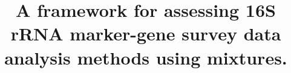 \documentclass[linenumbers]{bmcart} %
\providecommand{\DIFaddbegin}{} %
\providecommand{\DIFaddend}{} %
\providecommand{\DIFdelbegin}{} %
\providecommand{\DIFdelend}{} %
\begin{document}
\begin{frontmatter}

\begin{fmbox}


\title{A framework for assessing 16S rRNA marker-gene survey data analysis methods using mixtures.}


\author[
   addressref={aff1,aff2,aff3},                   %
   corref={aff1},                       %
   email={nolson@nist.gov}   %
]{\DIFdelbegin %
\DIFdelend \DIFaddbegin {} \DIFaddend {}}
\author[
   addressref={aff2,aff3},
   email={smuthiah@umiacs.umd.edu}
]{ }
\author[
   addressref={aff4},
   email={sli1@epi.umaryland.edu}
]{ }
\DIFaddbegin \author[
   addressref={aff2,aff3},
   email={dbraccia@umd.edu}
]{ }
\DIFaddend \author[
   addressref={aff5},
   email={shao4@jhu.edu}
]{ }
\author[
   addressref={aff5},
   email={wtimp@jhu.edu}
]{ }
\author[
   addressref={aff6},
   email={msalit@stanford.edu}
]{ }
\author[
   addressref={aff4},
   email={cstine@som.umaryland.edu}
]{ }
\author[
   addressref={aff2,aff3,aff7},
   email={hcorrada@umiacs.umd.edu}
]{ }



\end{fmbox}
\end{frontmatter}
\end{document}
